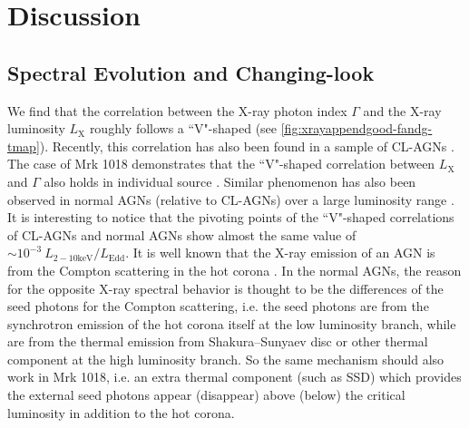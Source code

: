 \documentclass[twocolumn]{aastex63}
\begin{document}
\section{Discussion}\label{sec:discussion}
\subsection{Spectral Evolution and Changing-look}
\label{sec:spectral evolution}
We find that the correlation between the X-ray photon index $\Gamma$ and the X-ray luminosity $L_\mathrm{X}$ roughly follows a ``V"-shaped (see \autoref{fig:xrayappendgood-fandg-tmap}). Recently, this correlation has also been found in a sample of CL-AGNs \citep[e.g.][]{2019arXiv191203972L}. The case of Mrk 1018 demonstrates that the ``V"-shaped correlation between $L_\mathrm{X}$ and $\Gamma$ also holds in individual source \citep[see also in ][etc]{2020ApJ...890L..29A}. Similar phenomenon has also been observed in normal AGNs (relative to CL-AGNs) over a large luminosity range \citep[e.g. ][]{2009MNRAS.399..349G, 2011A&A...530A.149Y}. It is interesting to notice that the pivoting points of the ``V"-shaped correlations of CL-AGNs and normal AGNs show almost the same value of  $\sim 10^{-3}~L_\mathrm{2-10 keV}/L_\mathrm{Edd}$. It is well known that the X-ray emission of an AGN is from the Compton scattering in the hot corona \citep[e.g.][]{1991ApJ...380L..51H}. In the normal AGNs, the reason for the opposite X-ray spectral behavior is thought to be the differences of the seed photons for the Compton scattering, i.e. the seed photons are from the synchrotron emission of the hot corona itself at the low luminosity branch, while are from the thermal emission from Shakura–Sunyaev disc \citep[SSD; e.g. ][]{2013ApJ...764....2Q} or other thermal component \citep{2015MNRAS.447.1692Y} at the high luminosity branch. So the same mechanism should also work in Mrk 1018, i.e. an extra thermal component (such as SSD) which provides the external seed photons appear (disappear) above (below) the critical luminosity in addition to the hot corona. 
\end{document}
